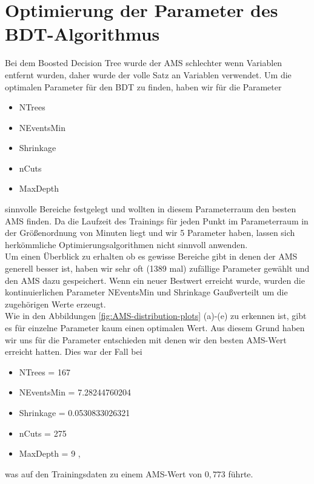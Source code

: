 \section{Optimierung der Parameter des BDT-Algorithmus}
Bei dem Boosted Decision Tree wurde der AMS schlechter wenn Variablen entfernt wurden, daher wurde der volle Satz an Variablen verwendet. Um die optimalen Parameter für den BDT zu finden, haben wir für die Parameter
\begin{itemize}
	\item NTrees
	\item NEventsMin
	\item Shrinkage
	\item nCuts
	\item MaxDepth
\end{itemize} 
sinnvolle Bereiche festgelegt und wollten in diesem Parameterraum den besten AMS finden. Da die Laufzeit des Trainings für jeden Punkt im Parameterraum in der Größenordnung von Minuten liegt und wir 5 Parameter haben, lassen sich herkömmliche Optimierungsalgorithmen nicht sinnvoll anwenden.\\
Um einen Überblick zu erhalten ob es gewisse Bereiche gibt in denen der AMS generell besser ist, haben wir sehr oft (1389 mal) zufällige Parameter gewählt und den AMS dazu gespeichert. Wenn ein neuer Bestwert erreicht wurde, wurden die kontinuierlichen Parameter NEventsMin und Shrinkage Gaußverteilt um die zugehörigen Werte erzeugt.\\
Wie in den Abbildungen \ref{fig:AMS-distribution-plots} (a)-(e) zu erkennen ist, gibt es für einzelne Parameter kaum einen optimalen Wert. Aus diesem Grund haben wir uns für die Parameter entschieden mit denen wir den besten AMS-Wert erreicht hatten. Dies war der Fall bei
\begin{itemize}
	\item NTrees = 167
	\item NEventsMin = 7.28244760204
	\item Shrinkage = 0.0530833026321
	\item nCuts = 275
	\item MaxDepth  = 9  ,
\end{itemize} 
was auf den Trainingsdaten zu einem AMS-Wert von $0{,}773$ führte.

